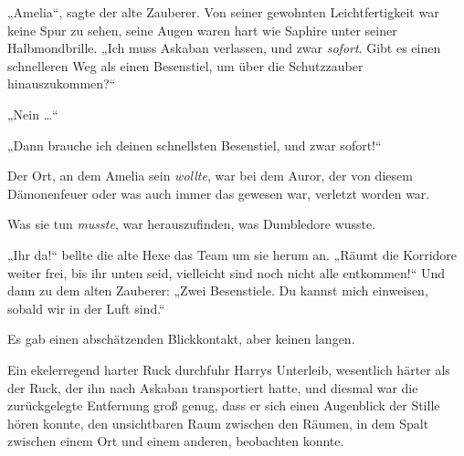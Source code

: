 „Amelia“, sagte der alte Zauberer. Von seiner gewohnten Leichtfertigkeit war keine Spur zu sehen, seine Augen waren hart wie Saphire unter seiner Halbmondbrille.
„Ich muss Askaban verlassen, und zwar \emph{sofort}. Gibt es einen schnelleren Weg als einen Besenstiel, um über die Schutzzauber hinauszukommen?“

„Nein …“

„Dann brauche ich deinen schnellsten Besenstiel, und zwar sofort!“

Der Ort, an dem Amelia sein \emph{wollte}, war bei dem Auror, der von diesem Dämonenfeuer oder was auch immer das gewesen war, verletzt worden war.

Was sie tun \emph{musste}, war herauszufinden, was Dumbledore wusste.

„Ihr da!“ bellte die alte Hexe das Team um sie herum an.
„Räumt die Korridore weiter frei, bis ihr unten seid, vielleicht sind noch nicht alle entkommen!“ Und dann zu dem alten Zauberer:
„Zwei Besenstiele. Du kannst mich einweisen, sobald wir in der Luft sind.“

Es gab einen abschätzenden Blickkontakt, aber keinen langen.

\later

Ein ekelerregend harter Ruck durchfuhr Harrys Unterleib, wesentlich härter als der Ruck, der ihn nach Askaban transportiert hatte, und diesmal war die zurückgelegte Entfernung groß genug, dass er sich einen Augenblick der Stille hören konnte, den unsichtbaren Raum zwischen den Räumen, in dem Spalt zwischen einem Ort und einem anderen, beobachten konnte.

